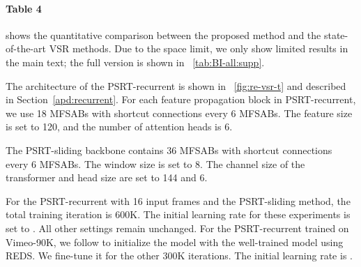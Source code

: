 \documentclass{article}
\begin{document}
\vspace{-3mm}
\paragraph{Table 4}
shows the quantitative comparison between the proposed method and the state-of-the-art VSR methods.
Due to the space limit, we only show limited results in the main text; the full version is shown in \tablename~\ref{tab:BI-all:supp}.


The architecture of the PSRT-recurrent is shown in \figurename~\ref{fig:re-vsr-t} and described in Section~\ref{apd:recurrent}.
For each feature propagation block in PSRT-recurrent, we use 18 MFSABs with shortcut connections every 6 MFSABs.
The feature size is set to 120, and the number of attention heads is 6.


The PSRT-sliding backbone contains 36 MFSABs with shortcut connections every 6 MFSABs.
The window size is set to 8.
The channel size of the transformer and head size are set to 144 and 6.


For the PSRT-recurrent with 16 input frames and the PSRT-sliding method, the total training iteration is 600K.
The initial learning rate for these experiments is set to .
All other settings remain unchanged.
For the PSRT-recurrent trained on Vimeo-90K, we follow \cite{chan2021basicvsr++} to initialize the model with the well-trained model using REDS.
We fine-tune it for the other 300K iterations.
The initial learning rate is .
\end{document}

